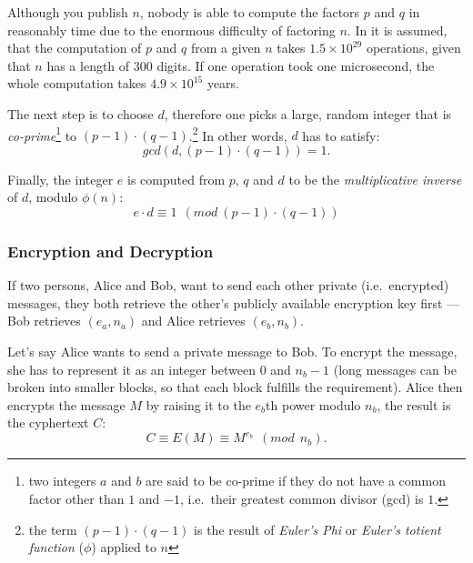 Although you  publish $n$, nobody is  able to compute the  factors $p$ and
$q$ in  reasonably time due to  the enormous difficulty  of factoring $n$.
In \cite{rivest77method}  it is assumed,  that the computation of  $p$ and
$q$ from a given $n$ takes $1.5 \times 10^{29}$ operations, given that $n$
has a length  of $300$ digits. If one operation  took one microsecond, the
whole computation takes $4.9 \times 10^{15}$ years.

The  next step  is to  choose  $d$, therefore  one picks  a large,  random
integer that is \emph{co-prime}\footnote{two integers $a$ and $b$ are said
  to be co-prime  if they do not  have a common factor other  than $1$ and
  $-1$, i.e.~their greatest common divisor  (gcd) is $1$.} to $(p-1) \cdot
(q-1)$.\footnote{the term $(p-1)\cdot(q-1)$ is the result of \emph{Euler's
    Phi} or  \emph{Euler's totient function}  ($\phi$) applied to  $n$} In
other words, $d$ has to satisfy:
\begin{equation*}
  \label{eq:compute-d}
  gcd(d, (p-1) \cdot (q-1)) = 1.
\end{equation*}

Finally,  the integer $e$  is computed  from $p$,  $q$ and  $d$ to  be the
\emph{multiplicative inverse} of $d$, modulo $\phi(n)$:
\begin{equation*}
  \label{eq:compute-e}
  e \cdot d \equiv 1\ \ (mod\ (p-1) \cdot (q-1))
\end{equation*}

\subsubsection{Encryption and Decryption}

If  two  persons,  Alice  and   Bob,  want  to  send  each  other  private
(i.e.~encrypted)  messages,  they   both  retrieve  the  other's  publicly
available encryption  key first ---  Bob retrieves $(e_a, n_a)$  and Alice
retrieves $(e_b, n_b)$.

Let's say  Alice wants to send a  private message to Bob.   To encrypt the
message, she has to  represent it as an integer between $0$  and $n_b - 1$
(long  messages can  be broken  into smaller  blocks, so  that  each block
fulfills the requirement). Alice then  encrypts the message $M$ by raising
it to the $e_b$th power modulo $n_b$, the result is the cyphertext $C$:
\begin{equation*}
  \label{eq:encrypt-message}
  C \equiv E(M) \equiv M^{e_b}\ \ (mod\ \ n_b).
\end{equation*}

